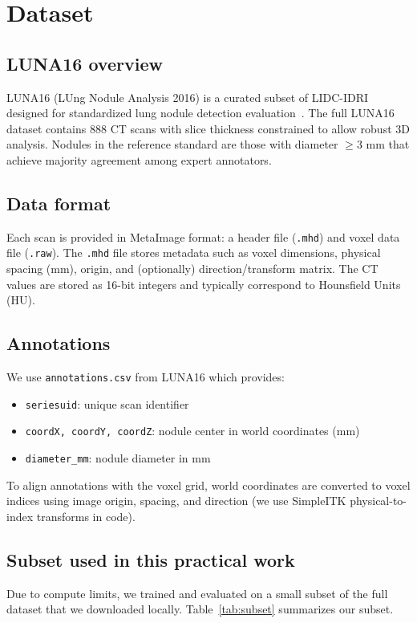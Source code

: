 \section{Dataset}
\subsection{LUNA16 overview}
LUNA16 (LUng Nodule Analysis 2016) is a curated subset of LIDC-IDRI designed for standardized lung nodule detection evaluation~\cite{setio2017luna16}. The full LUNA16 dataset contains 888 CT scans with slice thickness constrained to allow robust 3D analysis. Nodules in the reference standard are those with diameter $\geq 3$ mm that achieve majority agreement among expert annotators.

\subsection{Data format}
Each scan is provided in MetaImage format: a header file (\texttt{.mhd}) and voxel data file (\texttt{.raw}). The \texttt{.mhd} file stores metadata such as voxel dimensions, physical spacing (mm), origin, and (optionally) direction/transform matrix. The CT values are stored as 16-bit integers and typically correspond to Hounsfield Units (HU).

\subsection{Annotations}
We use \texttt{annotations.csv} from LUNA16 which provides:
\begin{itemize}
  \item \texttt{seriesuid}: unique scan identifier
  \item \texttt{coordX, coordY, coordZ}: nodule center in world coordinates (mm)
  \item \texttt{diameter\_mm}: nodule diameter in mm
\end{itemize}
To align annotations with the voxel grid, world coordinates are converted to voxel indices using image origin, spacing, and direction (we use SimpleITK physical-to-index transforms in code).

\subsection{Subset used in this practical work}
Due to compute limits, we trained and evaluated on a small subset of the full dataset that we downloaded locally. Table~\ref{tab:subset} summarizes our subset. 

